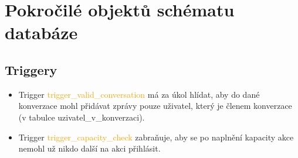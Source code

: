 \documentclass[11pt,a4paper]{article}
\begin{document}
\section{Pokročilé objektů schématu databáze}
    \subsection{Triggery}
        \begin{itemize}
            \item Trigger \textcolor{orange}{trigger\_valid\_conversation} má za úkol hlídat, aby do dané konverzace mohl přidávat zprávy pouze uživatel, který je členem konverzace (v tabulce uzivatel\_v\_konverzaci).
            \item Trigger \textcolor{orange}{trigger\_capacity\_check} zabraňuje, aby se po naplnění kapacity akce nemohl už nikdo další na akci přihlásit.
        \end{itemize}
\end{document}
